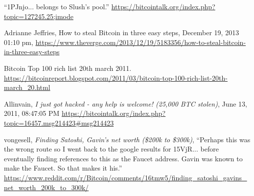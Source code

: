 \documentclass{article}
\begin{document}
\begin{thebibliography}{9}
``1PJnjo... belongs to Slush's pool.''
\url{https://bitcointalk.org/index.php?topic=127245.25;imode}

Adrianne Jeffries, How to steal Bitcoin in three easy steps, December 19, 2013 01:10 pm,
\url{https://www.theverge.com/2013/12/19/5183356/how-to-steal-bitcoin-in-three-easy-steps}

Bitcoin Top 100 rich list 20th march 2011.
\url{https://bitcoinreport.blogspot.com/2011/03/bitcoin-top-100-rich-list-20th-march_20.html}

Allinvain, \textit{I just got hacked - any help is welcome! (25,000 BTC stolen)}, June 13, 2011, 08:47:05 PM
\url{https://bitcointalk.org/index.php?topic=16457.msg214423#msg214423}

vongesell,
\textit{Finding Satoshi, Gavin's net worth (\$200k to \$300k)},
``Perhaps this was the wrong route so I went back to the google results for 15VjR... before eventually finding references to this as the Faucet address. Gavin was known to make the Faucet. So that makes it his.''
\url{https://www.reddit.com/r/Bitcoin/comments/16tmw5/finding_satoshi_gavins_net_worth_200k_to_300k/}

\end{thebibliography}
\end{document}
